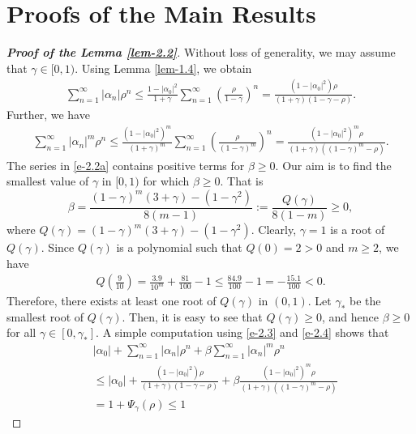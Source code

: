 \documentclass[a4paper,12pt]{amsart}
\theoremstyle{plain}
\theoremstyle{definition}
\begin{document}
\section{Proofs of the Main Results}
\begin{proof}[\bf Proof of the Lemma \ref{lem-2.2}]
	Without loss of generality, we may assume that $ \gamma\in [0,1) $. Using Lemma \ref{lem-1.4}, we obtain
	\begin{align}\label{e-2.3}
		\sum_{n=1}^{\infty}|\alpha_n|\rho^n\leq \frac{1-|\alpha_0|^2}{1+\gamma}\sum_{n=1}^{\infty}\left(\frac{\rho}{1-\gamma}\right)^n=\frac{\left(1-|\alpha_0|^2\right)\rho}{(1+\gamma)(1-\gamma-\rho)}.
	\end{align}
	Further, we have 
	\begin{align}\label{e-2.4}
		\sum_{n=1}^{\infty}|\alpha_n|^m\rho^n\leq\frac{(1-|\alpha_0|^2)^m}{(1+\gamma)^m}\sum_{n=1}^{\infty}\left(\frac{\rho}{(1-\gamma)^m}\right)^n=\frac{\left(1-|\alpha_0|^2\right)^m\rho}{(1+\gamma)((1-\gamma)^m-\rho)}.
	\end{align}
	The series in \eqref{e-2.2a} contains positive terms for $ \beta\geq 0 $. Our aim is to find the smallest value of $ \gamma $ in $ [0,1) $ for which $ \beta\geq 0 $. That is
	\begin{equation*}
		\beta=\frac{(1-\gamma)^m(3+\gamma)-(1-\gamma^2)}{8(m-1)}:=\frac{Q(\gamma)}{8(1-m)}\geq 0,
	\end{equation*} where $ Q(\gamma)=(1-\gamma)^m(3+\gamma)-(1-\gamma^2). $ Clearly, $ \gamma=1 $ is a root of $ Q(\gamma) $. Since $ Q(\gamma) $ is a polynomial such that $ Q(0)=2>0 $ and  $ m\geq 2 $, we have 
	\begin{align*}
		Q\left(\frac{9}{10}\right)=\frac{3.9}{10^m}+\frac{81}{100}-1\leq \frac{84.9}{100}-1=-\frac{15.1}{100}<0.
	\end{align*}
	Therefore, there exists at least one root of $ Q(\gamma) $ in $ (0,1) $. Let $ \gamma_* $ be the smallest root of $ Q(\gamma) $. Then, it is easy to see that $ Q(\gamma)\geq 0 $, and hence $ \beta\geq 0 $ for all $ \gamma\in [0,\gamma_*]. $ A simple computation using \eqref{e-2.3} and \eqref{e-2.4} shows that
	\begin{align} &
		|\alpha_0|+\sum_{n=1}^{\infty}|\alpha_n|\rho^n+\beta\sum_{n=1}^{\infty}|\alpha_n|^m\rho^n\\&\leq\nonumber |\alpha_0|+\frac{\left(1-|\alpha_0|^2\right)\rho}{(1+\gamma)(1-\gamma-\rho)}+\beta\frac{\left(1-|\alpha_0|^2\right)^m\rho}{(1+\gamma)((1-\gamma)^m-\rho)}\\&=\nonumber 1+\Psi_{\gamma}(\rho)\leq 1

\end{align}
\end{proof}
\end{document}
